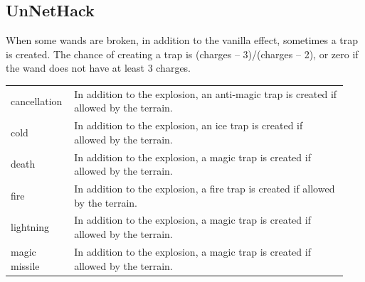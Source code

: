 \subsection{UnNetHack}
\label{22}
When some wands are broken, in addition to the vanilla effect, sometimes a trap\footnotemark[195] is created. The chance of creating a trap is (charges – 3)/(charges – 2), or zero if the wand does not have at least 3 charges.




\begin{longtable}{|>{\RaggedRight}p{0.15594\linewidth}|>{\RaggedRight}p{0.78691\linewidth}|} \hline 
{\bfseries \hspace*{0pt}\ignorespaces{}\hspace*{0pt}Wand}&{\bfseries \hspace*{0pt}\ignorespaces{}\hspace*{0pt}Effect when broken}\\ \hline \hspace*{0pt}\ignorespaces{}\hspace*{0pt}cancellation&\hspace*{0pt}\ignorespaces{}\hspace*{0pt}In addition to the explosion, an anti-{}magic trap is created if allowed by the terrain.\\ \hline \hspace*{0pt}\ignorespaces{}\hspace*{0pt}cold&\hspace*{0pt}\ignorespaces{}\hspace*{0pt}In addition to the explosion, an ice trap is created if allowed by the terrain.\\ \hline \hspace*{0pt}\ignorespaces{}\hspace*{0pt}death&\hspace*{0pt}\ignorespaces{}\hspace*{0pt}In addition to the explosion, a magic trap is created if allowed by the terrain.\\ \hline \hspace*{0pt}\ignorespaces{}\hspace*{0pt}fire&\hspace*{0pt}\ignorespaces{}\hspace*{0pt}In addition to the explosion, a fire trap is created if allowed by the terrain.\\ \hline \hspace*{0pt}\ignorespaces{}\hspace*{0pt}lightning&\hspace*{0pt}\ignorespaces{}\hspace*{0pt}In addition to the explosion, a magic trap is created if allowed by the terrain.\\ \hline \hspace*{0pt}\ignorespaces{}\hspace*{0pt}magic missile&\hspace*{0pt}\ignorespaces{}\hspace*{0pt}In addition to the explosion, a magic trap is created if allowed by the terrain.\\ 
\end{longtable}
